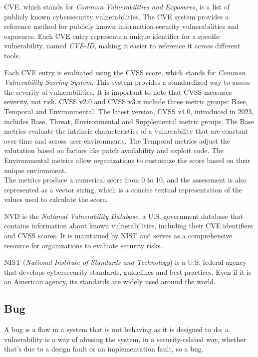 CVE, which stands for \textit{Common Vulnerabilities and Exposures}, is a list of publicly known cybersecurity vulnerabilities. The CVE system provides a reference method for publicly known information-security vulnerabilities and exposures. Each CVE entry represents a unique identifier for a specific vulnerability, named \textit{CVE-ID}, making it easier to reference it across different tools.

Each CVE entry is evaluated using the CVSS score, which stands for \textit{Common Vulnerability Scoring System}. This system provides a standardized way to assess the severity of vulnerabilities. It is important to note that CVSS measures severity, not risk. CVSS v2.0 and CVSS v3.x include three metric groups: Base, Temporal and Environmental. The latest version, CVSS v4.0, introduced in 2023, includes Base, Threat, Environmental and Supplemental metric groups. The Base metrics evaluate the intrinsic characteristics of a vulnerability that are constant over time and across user environments. The Temporal metrics adjust the valutation based on factors like patch availability and exploit code. The Environmental metrics allow organizations to customize the score based on their unique environment.\\
The metrics produce a numerical score from 0 to 10, and the assessment is also represented as a vector string, which is a concise textual representation of the values used to calculate the score.~\cite{cvss-metrics}


NVD is the \textit{National Vulnerability Database}, a U.S. government database that contains information about known vulnerabilities, including their CVE identifiers and CVSS scores. It is maintained by NIST and serves as a comprehensive resource for organizations to evaluate security risks.

NIST (\textit{National Institute of Standards and Technology}) is a U.S. federal agency that develops cybersecurity standards, guidelines and best practices. Even if it is an American agency, its standards are widely used around the world.

\subsection{Bug}

A bug is a flaw in a system that is not behaving as it is designed to do; a vulnerability is a way of abusing the system, in a security-related way, whether that's due to a design fault or an implementation fault, so a bug.

